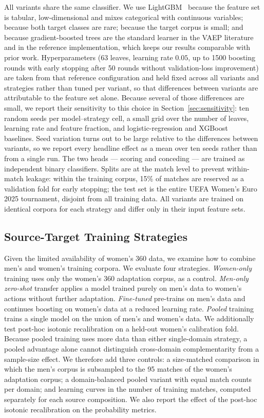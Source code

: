 \documentclass[runningheads]{llncs}
\begin{document}
All variants share the same classifier. We use LightGBM~\cite{ke2017lightgbm} because the feature set is tabular, low-dimensional and mixes categorical with continuous variables; because both target classes are rare; because the target corpus is small; and because gradient-boosted trees are the standard learner in the VAEP literature and in the reference implementation, which keeps our results comparable with prior work. Hyperparameters (63 leaves, learning rate $0.05$, up to 1500 boosting rounds with early stopping after 50 rounds without validation-loss improvement) are taken from that reference configuration and held fixed across all variants and strategies rather than tuned per variant, so that differences between variants are attributable to the feature set alone. Because several of those differences are small, we report their sensitivity to this choice in Section~\ref{sec:sensitivity}: ten random seeds per model--strategy cell, a small grid over the number of leaves, learning rate and feature fraction, and logistic-regression and XGBoost~\cite{chen2016xgboost} baselines. Seed variation turns out to be large relative to the differences between variants, so we report every headline effect as a mean over ten seeds rather than from a single run. The two heads --- scoring and conceding --- are trained as independent binary classifiers. Splits are at the match level to prevent within-match leakage: within the training corpus, 15\% of matches are reserved as a validation fold for early stopping; the test set is the entire UEFA Women's Euro 2025 tournament, disjoint from all training data. All variants are trained on identical corpora for each strategy and differ only in their input feature sets.


\subsection{Source-Target Training Strategies}

Given the limited availability of women's 360 data, we examine how to combine men's and women's training corpora. We evaluate four strategies. \emph{Women-only} training uses only the women's 360 adaptation corpus, as a control. \emph{Men-only zero-shot} transfer applies a model trained purely on men's data to women's actions without further adaptation. \emph{Fine-tuned} pre-trains on men's data and continues boosting on women's data at a reduced learning rate. \emph{Pooled} training trains a single model on the union of men's and women's data. We additionally test post-hoc isotonic recalibration on a held-out women's calibration fold. Because pooled training uses more data than either single-domain strategy, a pooled advantage alone cannot distinguish cross-domain complementarity from a sample-size effect. We therefore add three controls: a size-matched comparison in which the men's corpus is subsampled to the 95 matches of the women's adaptation corpus; a domain-balanced pooled variant with equal match counts per domain; and learning curves in the number of training matches, computed separately for each source composition. We also report the effect of the post-hoc isotonic recalibration on the probability metrics.
\end{document}

